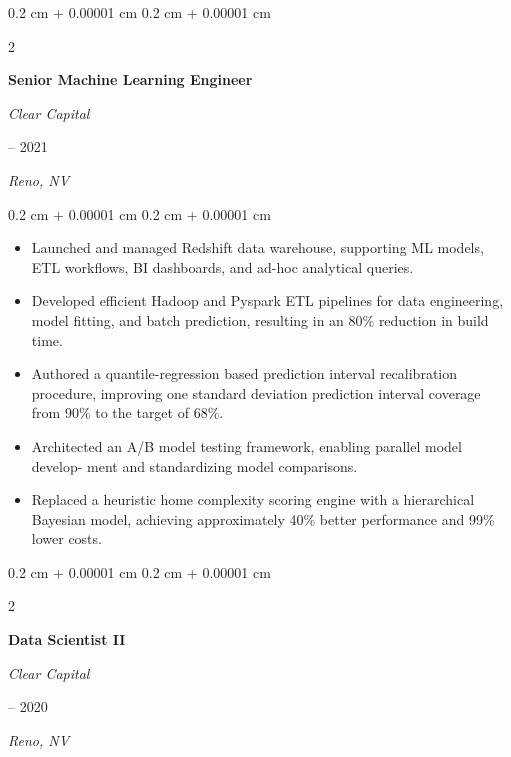 \documentclass[11pt, letterpaper]{article}
\newenvironment{highlights}{
    \begin{itemize}[
        topsep=0.10 cm,
        parsep=0.10 cm,
        partopsep=0pt,
        itemsep=0pt,
        leftmargin=0.4 cm + 10pt
    ]
}{
    \end{itemize}
} %
\newenvironment{onecolentry}{
    \begin{adjustwidth}{
        0.2 cm + 0.00001 cm
    }{
        0.2 cm + 0.00001 cm
    }
}{
    \end{adjustwidth}
} %
\newenvironment{twocolentry}[2][]{
    \onecolentry
    \def\secondColumn{#2}
    \setcolumnwidth{\fill, 4.5 cm}
    \begin{paracol}{2}
}{
    \switchcolumn \raggedleft \secondColumn
    \end{paracol}
    \endonecolentry
} %
\begin{document}
\begin{twocolentry}{
        2020 – 2021

        \textit{Reno, NV}
    }
    \textbf{Senior Machine Learning Engineer}

    \textit{Clear Capital}
\end{twocolentry}

\begin{onecolentry}
    \begin{highlights}

        \item Launched and managed Redshift data warehouse, supporting ML models, ETL
        workﬂows, BI dashboards, and ad-hoc analytical queries.
        \item Developed eﬃcient Hadoop and Pyspark ETL pipelines for data engineering,
        model ﬁtting, and batch prediction, resulting in an 80\% reduction in build time.
        \item Authored a quantile-regression based prediction interval recalibration procedure, improving
        one standard deviation prediction interval coverage from 90\% to the target of 68\%.
        \item Architected an A/B model testing framework, enabling parallel model develop-
        ment and standardizing model comparisons.
        \item Replaced a heuristic home complexity scoring engine with a hierarchical Bayesian model,
        achieving approximately 40\% better performance and 99\% lower costs.

    \end{highlights}
\end{onecolentry}

\vspace{0.2 cm}
\begin{twocolentry}{
        2017 – 2020

        \textit{Reno, NV}
    }
    \textbf{Data Scientist II}

    \textit{Clear Capital}
\end{twocolentry}
\end{document}
